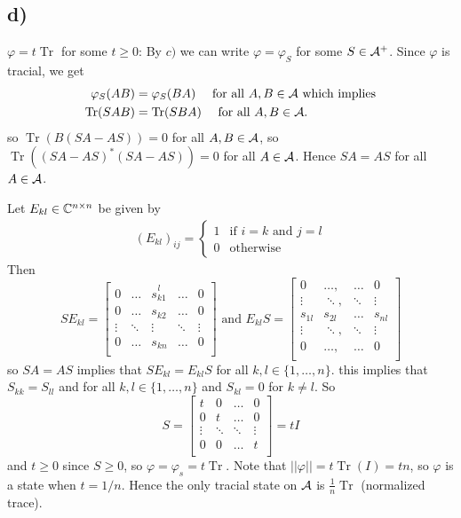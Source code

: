 \documentclass[10pt,english,a4paper]{article}
\theoremstyle{definition}
\DeclareMathOperator{\Tr}{Tr}
\def\vphi{\varphi}
\begin{document}
\subsection*{d)}
$\vphi = t\Tr$ for some $t \geq 0$:
By $c)$ we can write $\vphi = \vphi_{S}$ for some $S \in \mathcal{A}^+$. Since
$\vphi$ is tracial, we get 
\begin{align*}
\vphi_S(AB) &= \vphi_{S}(BA)\quad\text{ for all }A,B\in \As\text{ which implies}\\ 
\Tr(SAB) &= \Tr(SBA) \quad\text{ for all }A,B\in \As. 
\end{align*}
so $\Tr(B(SA-AS))=0$ for all $A,B\in \mathcal{A}$, so 
$\Tr((SA-AS)^*(SA-AS)) = 0$ for all $A \in \mathcal{A}$.
Hence $SA=AS$ for all $A \in \mathcal{A}$.

Let $E_{kl}\in \mathbb{C}^{n\times n}$ be given by 
\begin{align*}
    (E_{kl})_{ij} = \begin{cases} 1&\text{if }i=k \text{ and }j=l \\
    0 &\text{otherwise} \end{cases}
\end{align*}
Then 
\[
SE_{kl} = \begin{bmatrix} 
0&\ldots &\overset{l}{s_{k1}} &\ldots &0\\
0&\ldots &s_{k2} &\ldots &0\\
\vdots&\ddots &\vdots &\ddots &\vdots\\
0&\ldots &s_{kn} &\ldots &0\\
  \end{bmatrix}
\text{ and }
E_{kl}S = \begin{bmatrix} 
0&\ldots,&\ldots & 0\\
\vdots&\ddots,&\ddots & \vdots\\
s_{1l} & s_{2l}&\ldots & s_{nl} \\
\vdots&\ddots,&\ddots & \vdots\\
0&\ldots,&\ldots & 0\\
\end{bmatrix}
\]
so $SA=AS$ implies that $SE_{kl}=E_{kl}S$ for all $k,l\in \{1,\ldots,n\}$.
this implies that $S_{kk}= S_{ll}$ and for all $k,l\in \{1,\ldots,n\}$
and $S_{kl} = 0$ for $k\neq l$. So
\[S = \begin{bmatrix} 
t & 0 &\ldots & 0 \\
0 & t &\ldots & 0 \\
\vdots & \ddots &\ddots & \vdots \\
0 & 0 &\ldots & t \\
 \end{bmatrix} = tI\]
and $t \geq 0$ since $S \geq 0$, so $\vphi = \vphi_s = t\Tr$.
Note that $||\vphi|| = t \Tr(I) = t n$, so $\vphi$ is a state when 
$t=1/n$. Hence the only tracial state on $\mathcal{A}$ is $\tfrac{1}{n}\Tr$ (normalized trace).
\end{document}
